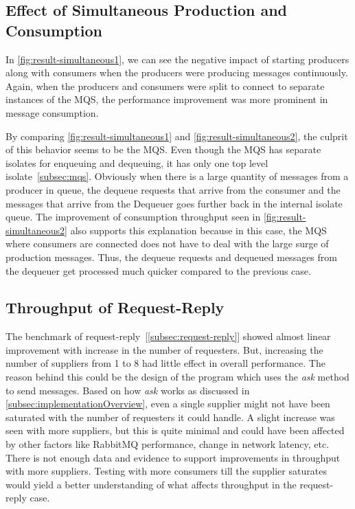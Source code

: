 \subsection{Effect of Simultaneous Production and Consumption}
In \autoref{fig:result-simultaneous1}, we can see the negative impact of starting producers along with consumers when the producers were producing messages continuously. Again, when the producers and consumers were split to connect to separate instances of the MQS, the performance improvement was more prominent in message consumption.

  By comparing \autoref{fig:result-simultaneous1} and \autoref{fig:result-simultaneous2}, the culprit of this behavior seems to be the MQS. Even though the MQS has separate isolates for enqueuing and dequeuing, it has only one top level isolate~\autoref{subsec:mqs}. Obviously when there is a large quantity of messages from a producer in queue, the dequeue requests that arrive from the consumer and the messages that arrive from the Dequeuer goes further back in the internal isolate queue. The improvement of consumption throughput seen in
   \autoref{fig:result-simultaneous2} also supports this explanation because in this case, the MQS where consumers are connected does not have to deal with the large surge of production messages. Thus, the dequeue requests and dequeued messages from the dequeuer get processed much quicker compared to the previous case.

\subsection{Throughput of Request-Reply}
  The benchmark of request-reply~[\autoref{subsec:request-reply}] showed almost linear improvement with increase in the number of requesters. But, increasing the number of suppliers from 1 to 8 had little effect in overall performance. The reason behind this could be the design of the program which uses the \emph{ask} method to send messages. Based on how \emph{ask} works as discussed in \autoref{subsec:implementationOverview}, even a single supplier might not have been saturated with the number of requesters it could handle. A slight increase was seen with more suppliers, but this is quite minimal and could have been affected by other factors like RabbitMQ performance, change in network latency, etc. There is not enough data and evidence to support improvements in throughput with more suppliers. Testing with more consumers till the supplier saturates would yield a better understanding of what affects throughput in the request-reply case.

